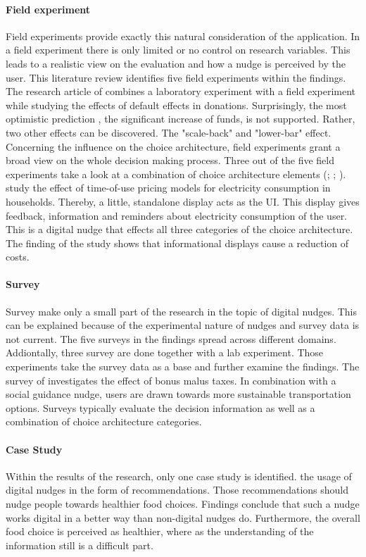 \paragraph{Field experiment}
Field experiments provide exactly this natural consideration of the application. In a field experiment there is only limited or no control on research variables. This leads to a realistic view on the evaluation and how a nudge is perceived by the user. This literature review identifies five field experiments within the findings. The research article of \cite{goswami_when_2016} combines a laboratory experiment with a field experiment while studying the effects of default effects in donations. Surprisingly, the most optimistic prediction , the significant increase of funds, is not supported. Rather, two other effects can be discovered. The "scale-back" and "lower-bar" effect. 
Concerning the influence on the choice architecture, field experiments grant a broad view on the whole decision making process. Three out of the five field experiments take a look at a combination of choice architecture elements (\cite{miller_effects_2016}; \cite{cosmo_nudging_2017}; \cite{mazar_if_2018}). \cite{cosmo_nudging_2017} study the effect of time-of-use pricing models for electricity consumption in households. Thereby, a little, standalone display acts as the UI. This display gives feedback, information and reminders about electricity consumption of the user. This is a digital nudge that effects all three categories of the choice architecture. The finding of the study shows that informational displays cause a reduction of costs.

\paragraph{Survey}
Survey make only a small part of the research in the topic of digital nudges. This can be explained because of the experimental nature of nudges and survey data is not current. The five surveys in the findings spread across different domains. Addiontally, three survey are done together with a lab experiment. Those experiments take the survey data as a base and further examine the findings. The survey of \cite{hilton_tax_2014} investigates the effect of bonus malus taxes. In combination with a social guidance nudge, users are drawn towards more sustainable transportation options. Surveys typically evaluate the decision information as well as a combination of choice architecture categories.

\paragraph{Case Study}
Within the results of the research, only one case study is identified. \cite{guthrie_nudging_2015} the usage of digital nudges in the form of recommendations. Those recommendations should nudge people towards healthier food choices. Findings conclude that such a nudge works digital in a better way than non-digital nudges do. Furthermore, the overall food choice is perceived as healthier, where as the understanding of the information still is a difficult part.


